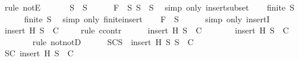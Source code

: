 \begin{isabellebody}
\ {\isacharparenleft}rule\ notE{\isacharparenright}\isanewline
\ \ \isamarkupfalse%
\isanewline
\ \ \isamarkupfalse%
\ {}{\isacharcolon}{\isachardoublequoteopen}{\isacharquery}S{}\ {\isasymsubseteq}\ S{\isachardoublequoteclose}\isanewline
\ \ \ \ \isamarkupfalse%
\ {\isacartoucheopen}F\ {\isasymin}\ S{\isacartoucheclose}\ {\isacartoucheopen}S{}\ {\isasymsubseteq}\ S{\isacartoucheclose}\ \isamarkupfalse%
\ {\isacharparenleft}simp\ only{\isacharcolon}\ insert{\isacharunderscore}subset{\isacharparenright}\isanewline
\ \ \isamarkupfalse%
\ {}{\isacharcolon}{\isachardoublequoteopen}finite\ {\isacharquery}S{}{\isachardoublequoteclose}\isanewline
\ \ \ \ \isamarkupfalse%
\ {\isacartoucheopen}finite\ S{}{\isacartoucheclose}\ \isamarkupfalse%
\ {\isacharparenleft}simp\ only{\isacharcolon}\ finite{\isacharunderscore}insert{\isacharparenright}\isanewline
\ \ \isamarkupfalse%
\ {}{\isacharcolon}{\isachardoublequoteopen}F\ {\isasymin}\ {\isacharquery}S{}{\isachardoublequoteclose}\isanewline
\ \ \ \ \isamarkupfalse%
\ {\isacharparenleft}simp\ only{\isacharcolon}\ insertI{}{\isacharparenright}\isanewline
\ \ \isamarkupfalse%
\ {}{\isacharcolon}{\isachardoublequoteopen}insert\ H\ {\isacharquery}S{}\ {\isasymnotin}\ C{\isachardoublequoteclose}\ \isanewline
\ \ \isamarkupfalse%
\ {\isacharparenleft}rule\ ccontr{\isacharparenright}\isanewline
\ \ \ \ \isamarkupfalse%
\ {\isachardoublequoteopen}{\isasymnot}{\isacharparenleft}insert\ H\ {\isacharquery}S{}\ {\isasymnotin}\ C{\isacharparenright}{\isachardoublequoteclose}\isanewline
\ \ \ \ \isamarkupfalse%
\ \isamarkupfalse%
\ {\isachardoublequoteopen}insert\ H\ {\isacharquery}S{}\ {\isasymin}\ C{\isachardoublequoteclose}\isanewline
\ \ \ \ \ \ \isamarkupfalse%
\ {\isacharparenleft}rule\ notnotD{\isacharparenright}\isanewline
\ \ \ \ \isamarkupfalse%
\ SC{}{\isacharcolon}{\isachardoublequoteopen}{\isasymforall}S{\isacharprime}\ {\isasymsubseteq}\ {\isacharparenleft}insert\ H\ {\isacharquery}S{}{\isacharparenright}{\isachardot}\ S{\isacharprime}\ {\isasymin}\ C{\isachardoublequoteclose}\isanewline
\ \ \ \ \ \ \isamarkupfalse%
\ SC\ {\isacartoucheopen}insert\ H\ {\isacharquery}S{}\ {\isasymin}\ C{\isacartoucheclose}\ \isamarkupfalse%

\end{isabellebody}
